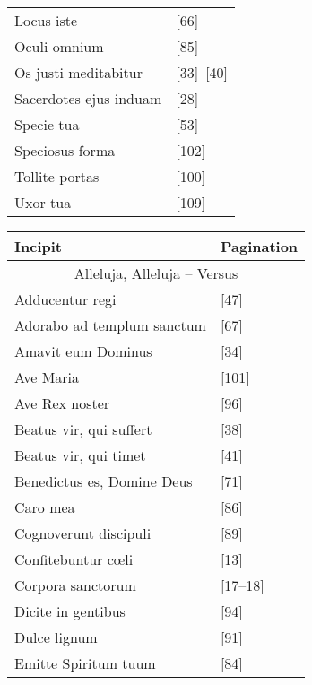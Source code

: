 \begin{landscape}
\begin{table}[ht]
\begin{tabular}{@{}ll@{}}
        Locus iste                 & [66]      \\
        Oculi omnium               & [85]      \\
        Os justi meditabitur       & [33]~[40] \\
        Sacerdotes ejus induam     & [28]      \\
        Specie tua                 & [53]      \\
        Speciosus forma            & [102]     \\
        Tollite portas             & [100]     \\
        Uxor tua                   & [109]     \\ \bottomrule
        \end{tabular}
        \hfill
        \begin{tabular}{@{}ll@{}}
          \toprule
          Incipit                    & Pagination \\ \midrule
          \multicolumn{2}{c}{Alleluja, Alleluja -- Versus} \\
          Adducentur regi                & [47]            \\
          Adorabo ad templum sanctum     & [67]            \\
          Amavit eum Dominus             & [34]            \\
          Ave Maria                      & [101]           \\
          Ave Rex noster                 & [96]            \\
          Beatus vir, qui suffert        & [38]            \\
          Beatus vir, qui timet          & [41]            \\
          Benedictus es, Domine Deus     & [71]            \\
          Caro mea                       & [86]            \\
          Cognoverunt discipuli          & [89]            \\
          Confitebuntur cœli             & [13]            \\
          Corpora sanctorum              & [17--18]        \\
          Dicite in gentibus             & [94]            \\
          Dulce lignum                   & [91]            \\
          Emitte Spiritum tuum           & [84]            \\

\end{tabular}
\end{table}
\end{landscape}
